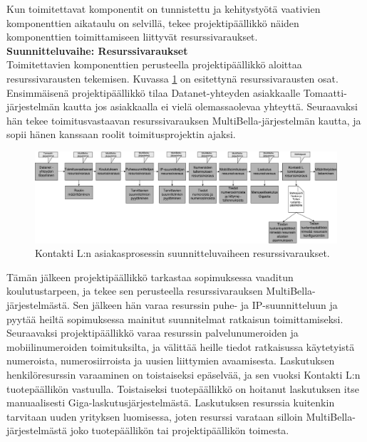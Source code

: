 \documentclass[finnish,12pt,a4paper,pdftex]{article}
\begin{document}
Kun toimitettavat komponentit on tunnistettu ja kehitystyötä vaativien komponenttien aikataulu on selvillä, tekee projektipäällikkö näiden komponenttien toimittamiseen liittyvät resurssivaraukset.\\

\textbf{Suunnitteluvaihe: Resurssivaraukset}\\

Toimitettavien komponenttien perusteella projektipäällikkö aloittaa resurssivarausten tekemisen. Kuvassa \ref{fig:resurssit} on esitettynä resurssivarausten osat. Ensimmäisenä projektipäällikkö tilaa Datanet-yhteyden asiakkaalle Tomaatti-järjestelmän kautta jos asiakkaalla ei vielä olemassaolevaa yhteyttä. Seuraavaksi hän tekee toimitusvastaavan resurssivarauksen MultiBella-järjestelmän kautta, ja sopii hänen kanssaan roolit toimitusprojektin ajaksi.\\

\begin{figure}[!h]
    \centering
    \includegraphics[scale=0.25]{images/resurssivaraukset.pdf}
    \caption{Kontakti L:n asiakasprosessin suunnitteluvaiheen resurssivaraukset.}
    \label{fig:resurssit}
\end{figure}

Tämän jälkeen projektipäällikkö tarkastaa sopimuksessa vaaditun koulutustarpeen, ja tekee sen perusteella resurssivarauksen MultiBella-järjestelmästä. Sen jälkeen hän varaa resurssin puhe- ja IP-suunnitteluun ja pyytää heiltä sopimuksessa mainitut suunnitelmat ratkaisun toimittamiseksi.\\

Seuraavaksi projektipäällikkö varaa resurssin palvelunumeroiden ja mobiilinumeroiden toimituksilta, ja välittää heille tiedot ratkaisussa käytetyistä numeroista, numerosiirroista ja uusien liittymien avaamisesta. Laskutuksen henkilöresurssin varaaminen on toistaiseksi epäselvää, ja sen vuoksi Kontakti L:n tuotepäällikön vastuulla. Toistaiseksi tuotepäällikkö on hoitanut laskutuksen itse manuaalisesti Giga-laskutusjärjestelmästä. Laskutuksen resurssia kuitenkin tarvitaan uuden yrityksen luomisessa, joten resurssi varataan silloin MultiBella-järjestelmästä joko tuotepäällikön tai projektipäällikön toimesta.\\
\end{document}
